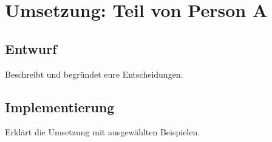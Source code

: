\chapter{Umsetzung: Teil von Person A}
\section{Entwurf}
Beschreibt und begründet eure Entscheidungen.
\section{Implementierung}
Erklärt die Umsetzung mit ausgewählten Beispielen.
